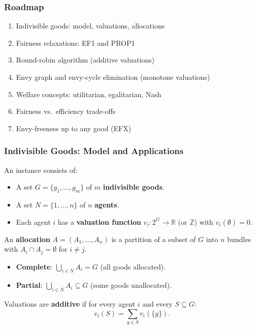 \subsubsection*{Roadmap}
\begin{enumerate}
  \item Indivisible goods: model, valuations, allocations
  \item Fairness relaxations: EF1 and PROP1
  \item Round-robin algorithm (additive valuations)
  \item Envy graph and envy-cycle elimination (monotone valuations)
  \item Welfare concepts: utilitarian, egalitarian, Nash
  \item Fairness vs.\ efficiency trade-offs
  \item Envy-freeness up to any good (EFX)
\end{enumerate}

\bigseparator

\subsubsection{Indivisible Goods: Model and Applications}

\begin{defbox}
An instance consists of:
\begin{itemize}
  \item A set $G = \{g_1, \ldots, g_m\}$ of $m$ \textbf{indivisible goods}.
  \item A set $N = \{1, \ldots, n\}$ of $n$ \textbf{agents}.
  \item Each agent $i$ has a \textbf{valuation function} $v_i : 2^G \to \mathbb{R}$ (or $\mathbb{Z}$) with $v_i(\emptyset) = 0$.
\end{itemize}

An \textbf{allocation} $A = (A_1, \ldots, A_n)$ is a partition of a subset of $G$ into $n$ bundles with $A_i \cap A_j = \emptyset$ for $i \neq j$.
\begin{itemize}
  \item \textbf{Complete}: $\bigcup_{i \in N} A_i = G$ (all goods allocated).
  \item \textbf{Partial}: $\bigcup_{i \in N} A_i \subseteq G$ (some goods unallocated).
\end{itemize}
\end{defbox}

\begin{defbox}
Valuations are \textbf{additive} if for every agent $i$ and every $S \subseteq G$:
\[
  v_i(S) = \sum_{g \in S} v_i(\{g\}).
\]
\end{defbox}

